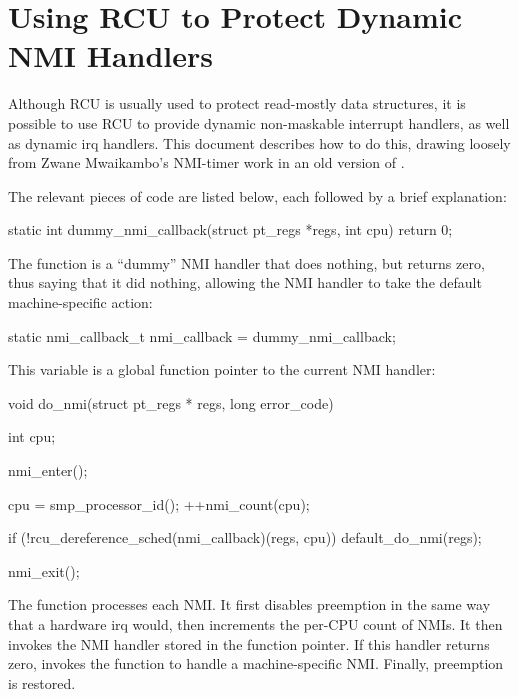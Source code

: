 
\section{Using RCU to Protect Dynamic NMI Handlers}
\label{sec:rcu:Using RCU to Protect Dynamic NMI Handlers}

Although RCU is usually used to protect read-mostly data structures,
it is possible to use RCU to provide dynamic non-maskable interrupt
handlers, as well as dynamic irq handlers.
This document describes
how to do this, drawing loosely from Zwane Mwaikambo's NMI-timer
work in an old version of .

The relevant pieces of code are listed below, each followed by a
brief explanation:

\begin{VerbatimU}
	static int dummy_nmi_callback(struct pt_regs *regs, int cpu)
	{
		return 0;
	}
\end{VerbatimU}

The  function is a ``dummy'' NMI handler that does
nothing, but returns zero, thus saying that it did nothing, allowing
the NMI handler to take the default machine-specific action:

\begin{VerbatimU}
	static nmi_callback_t nmi_callback = dummy_nmi_callback;
\end{VerbatimU}

This  variable is a global function pointer to the current
NMI handler:

\begin{VerbatimU}
	void do_nmi(struct pt_regs * regs, long error_code)
	{
		int cpu;

		nmi_enter();

		cpu = smp_processor_id();
		++nmi_count(cpu);

		if (!rcu_dereference_sched(nmi_callback)(regs, cpu))
			default_do_nmi(regs);

		nmi_exit();
	}
\end{VerbatimU}

The  function processes each NMI\@.
It first disables preemption
in the same way that a hardware irq would, then increments the per-CPU
count of NMIs.
It then invokes the NMI handler stored in the 
function pointer.
If this handler returns zero,  invokes the
 function to handle a machine-specific NMI\@.
Finally,
preemption is restored.

